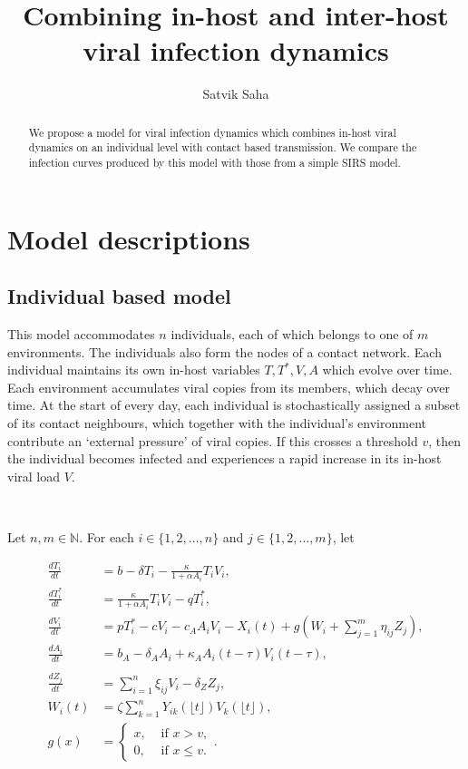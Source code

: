 \documentclass[11pt]{article}
\title{Combining in-host and inter-host viral infection dynamics}
\author{Satvik Saha}
\date{}
\numberwithin{equation}{subsection}
\begin{document}
    \maketitle

    \begin{abstract}
        We propose a model for viral infection dynamics which combines in-host
        viral dynamics on an individual level with contact based transmission.
        We compare the infection curves produced by this model with those from
        a simple SIRS model.
    \end{abstract}

    \section{Model descriptions}

    \subsection{Individual based model} \label{model:individual}

    This model accommodates $n$ individuals, each of which belongs to one of
    $m$ environments. The individuals also form the nodes of a contact
    network. Each individual maintains its own in-host variables $T, T^*, V,
    A$ which evolve over time. Each environment accumulates viral copies from
    its members, which decay over time. At the start of every day, each
    individual is stochastically assigned a subset of its contact neighbours,
    which together with the individual's environment contribute an `external
    pressure' of viral copies. If this crosses a threshold $v$, then the
    individual becomes infected and experiences a rapid increase in its
    in-host viral load $V$.

    ~

    Let $n, m \in \mathbb{N}$. For each $i \in \{1, 2, \dots, n\}$ and $j \in
    \{1, 2, \dots, m\}$, let

    \begin{align}
        \frac{dT_i}{dt} &= b -  \delta T_i - \frac{\kappa}{1 + \alpha A_i} T_iV_i, \\
        \frac{dT^*_i}{dt} &= \frac{\kappa}{1 + \alpha A_i} T_iV_i - qT^*_i, \\
        \frac{dV_i}{dt} &= pT^*_i - cV_i - c_A A_iV_i - X_i(t) + g\left(W_i + \sum_{j = 1}^m \eta_{ij} Z_j\right), \\
        \frac{dA_i}{dt} &= b_A -  \delta_A A_i + \kappa_A A_i(t - \tau)V_i(t - \tau), \\\\
        \frac{dZ_j}{dt} &= \sum_{i = 1}^n \xi_{ij} V_i - \delta_Z Z_j, \\
        W_i(t) &= \zeta \sum_{k = 1}^n Y_{ik}(\lfloor t\rfloor) V_k(\lfloor t\rfloor), \\
        g(x) &= \begin{cases}
            x, &\text{ if } x > v, \\
            0, &\text{ if } x \leq v.
        \end{cases}.
    \end{align}
\end{document}
